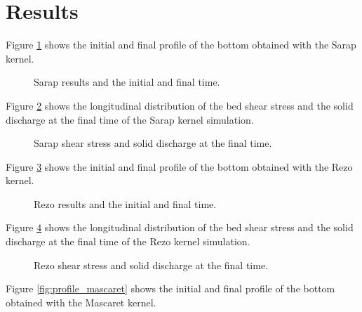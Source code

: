 \section{Results}

Figure \ref{fig:profile_sarap} shows the initial and final profile of 
the bottom obtained with the Sarap kernel.

\begin{figure}[h]
 \centering
 \caption{Sarap results and the initial and final time.}
 \label{fig:profile_sarap}
\end{figure}

Figure \ref{fig:tauqs_sarap} shows the longitudinal distribution of the
bed shear stress and the solid discharge at the final time of the Sarap
kernel simulation.

\begin{figure}[h]
 \centering
 \caption{Sarap shear stress and solid discharge at the final time.}
 \label{fig:tauqs_sarap}
\end{figure}

Figure \ref{fig:profile_rezo} shows the initial and final profile of 
the bottom obtained with the Rezo kernel.

\begin{figure}[h]
 \centering
 \caption{Rezo results and the initial and final time.}
 \label{fig:profile_rezo}
\end{figure}

Figure \ref{fig:tauqs_rezo} shows the longitudinal distribution of the
bed shear stress and the solid discharge at the final time of the Rezo
kernel simulation.

\begin{figure}[h]
 \centering
 \caption{Rezo shear stress and solid discharge at the final time.}
 \label{fig:tauqs_rezo}
\end{figure}

Figure \ref{fig:profile_mascaret} shows the initial and final profile of 
the bottom obtained with the Mascaret kernel.

